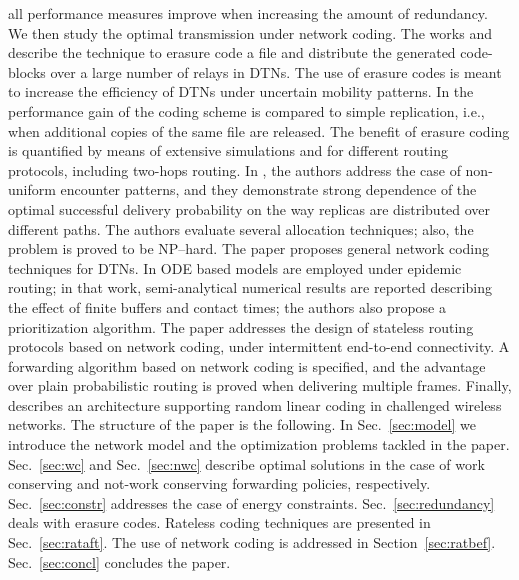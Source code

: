 \documentclass[10pt,twocolumn,conference,final]{IEEEtran}
\begin{document}
all performance measures improve when increasing the amount of redundancy. We then study
the optimal transmission under network coding.
 The works \cite{JDPF} and \cite{WJMK} describe the 
technique to erasure code a file and distribute the generated code-blocks over a 
large number of relays in DTNs. The use of erasure codes is meant to increase 
the efficiency of DTNs under uncertain mobility patterns. In \cite{WJMK} the 
performance gain of the coding scheme is compared to simple replication, i.e., 
when additional copies of the same file are released. The benefit of erasure 
coding is quantified by means of extensive simulations and for different routing 
protocols, including two-hops routing. 
In \cite{JDPF}, the authors address the case of non-uniform encounter patterns, 
and they demonstrate strong dependence of the optimal successful delivery probability
on the way replicas are distributed over different paths. The authors evaluate several
allocation techniques; also, the problem is proved to be NP--hard.
The paper \cite{FBW} proposes general network coding techniques for DTNs. In \cite{LLL}
ODE based models are employed under epidemic routing; in that work, 
semi-analytical numerical results are reported describing the effect 
of finite buffers and contact times; the authors also propose a prioritization algorithm.
The paper \cite{WB} addresses the design of stateless routing protocols based on 
network coding, under intermittent end-to-end connectivity. A forwarding 
algorithm based on network coding is specified, and the advantage 
over plain probabilistic routing is proved when delivering multiple frames.
Finally, \cite{FSCB} describes an architecture supporting random linear coding in challenged
wireless networks.
The structure of the paper is the following. In Sec.~\ref{sec:model} we introduce 
the network model and the optimization problems tackled in the paper. Sec.~\ref{sec:wc} and Sec.~\ref{sec:nwc} describe 
optimal solutions in the case of work conserving and not-work conserving forwarding policies, 
respectively. Sec.~\ref{sec:constr} addresses the case of energy constraints. Sec.~\ref{sec:redundancy}
 deals with erasure codes. Rateless coding techniques are presented in Sec.~\ref{sec:rataft}. The use of 
network coding is addressed in Section~\ref{sec:ratbef}. Sec.~\ref{sec:concl} concludes the paper.
\end{document}
